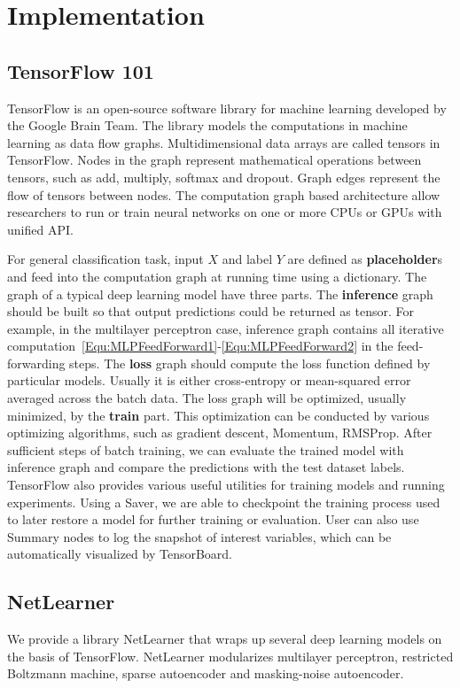 \section{Implementation}

\subsection{TensorFlow 101}
TensorFlow is an open-source software library for machine learning developed by the Google Brain Team.
The library models the computations in machine learning as data flow graphs.
Multidimensional data arrays are called tensors in TensorFlow.
Nodes in the graph represent mathematical operations between tensors,
such as add, multiply, softmax and dropout.
Graph edges represent the flow of tensors between nodes.
The computation graph based architecture allow researchers to run or train neural networks
on one or more CPUs or GPUs with unified API.

For general classification task, input $X$ and label $Y$ are defined as \textbf{placeholder}s
and feed into the computation graph at running time using a dictionary.
The graph of a typical deep learning model have three parts.
The \textbf{inference} graph should be built so that output predictions could be returned as tensor.
For example, in the multilayer perceptron case, inference graph contains all iterative
computation~\ref{Equ:MLPFeedForward1}-\ref{Equ:MLPFeedForward2} in the feed-forwarding steps.
The \textbf{loss} graph should compute the loss function defined by particular models.
Usually it is either cross-entropy or mean-squared error averaged across the batch data.
The loss graph will be optimized, usually minimized, by the \textbf{train} part.
This optimization can be conducted by various optimizing algorithms, such as gradient descent,
Momentum, RMSProp.
After sufficient steps of batch training, we can evaluate the trained model with inference
graph and compare the predictions with the test dataset labels.
TensorFlow also provides various useful utilities for training models and running experiments.
Using a Saver, we are able to checkpoint the training process used to later restore a model for
further training or evaluation.
User can also use Summary nodes to log the snapshot of interest variables, which can be
automatically visualized by TensorBoard.

\subsection{NetLearner}
We provide a library NetLearner that wraps up several deep learning models on the basis
of TensorFlow.
NetLearner modularizes multilayer perceptron, restricted Boltzmann machine, sparse autoencoder
and masking-noise autoencoder.


